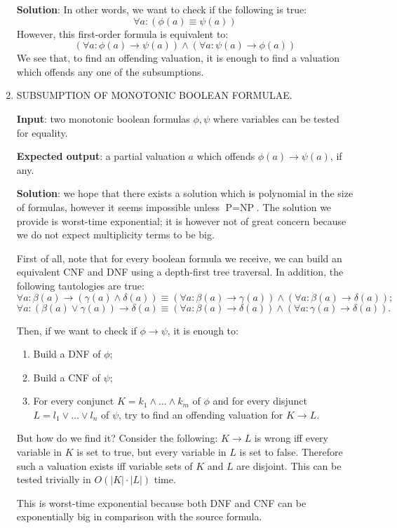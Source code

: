 \documentclass[a4paper,14pt]{extreport}
\begin{document}
\begin{enumerate}
        \textbf{Solution}: In other words, we want to check if the following is
        true:
        \[ \forall a: (\phi(a) \equiv \psi(a)) \]
        However, this first-order formula is equivalent to:
        \[
            (\forall a: \phi(a) \to \psi(a)) \land
            (\forall a: \psi(a) \to \phi(a))
        \]
        We see that, to find an offending valuation, it is enough to find a
        valuation which offends any one of the subsumptions.

    \item SUBSUMPTION OF MONOTONIC BOOLEAN FORMULAE.

        \textbf{Input}: two monotonic boolean formulas $\phi, \psi$ where
        variables can be tested for equality.

        \textbf{Expected output}: a partial valuation $a$ which offends
        $\phi(a) \to \psi (a)$, if any.

        \textbf{Solution}: we hope that there exists a solution which is
        polynomial in the size of formulas, however it seems impossible unless
        $\text{P}=\text{NP}$. The solution we provide is worst-time exponential;
        it is however not of great concern because we do not expect multiplicity
        terms to be big.

        First of all, note that for every boolean formula we receive, we can
        build an equivalent CNF and DNF using a depth-first tree traversal. In
        addition, the following tautologies are true:
        \[
            \forall a: \beta(a) \to (\gamma(a) \land \delta(a))
            \equiv (\forall a: \beta(a) \to \gamma(a))
            \land (\forall a: \beta(a) \to \delta(a));
        \]
        \[
            \forall a: (\beta(a) \lor \gamma(a)) \to \delta(a)
            \equiv (\forall a: \beta(a) \to \delta(a))
            \land (\forall a: \gamma(a) \to \delta(a)).
        \]

        Then, if we want to check if $\phi \to \psi$, it is enough to:
        \begin{enumerate}
            \item Build a DNF of $\phi$;
            \item Build a CNF of $\psi$;
            \item For every conjunct $K = k_1 \land \ldots \land k_m$ of $\phi$
                and for every disjunct $L = l_1 \lor \ldots \lor l_n$ of $\psi$,
                try to find an offending valuation for $K \to L$.
        \end{enumerate}

        But how do we find it? Consider the following: $K \to L$ is wrong iff
        every variable in $K$ is set to true, but every variable in $L$ is set
        to false. Therefore such a valuation exists iff variable sets of $K$ and
        $L$ are disjoint. This can be tested trivially in $O(|K| \cdot |L|)$
        time.

        This is worst-time exponential because both DNF and CNF can be
        exponentially big in comparison with the source formula.
\end{enumerate}
\end{document}
